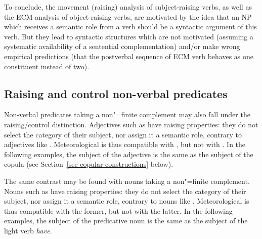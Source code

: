 To conclude, the movement (raising) analysis of subject-raising verbs, as well as the ECM analysis of object-raising verbs, are motivated by the idea that an NP which receives a semantic role from a verb should be a syntactic argument of this verb.
But they lead to syntactic structures which are not motivated (assuming a systematic availability of a sentential complementation) and/or make wrong empirical predictions (that the postverbal sequence of ECM verb behaves as one constituent instead of two).
 
\subsection{Raising and control non-verbal predicates}\label{nonverbal}

Non-verbal predicates taking a non"=finite complement may also fall under the raising/control distinction.  Adjectives such as  have raising properties: they do not select the category of their subject, nor assign it a semantic role, contrary to adjectives like . Meteorological  is thus compatible with , but not with . In the following examples, the subject of the adjective is the same as the subject of the copula (see Section~\ref{sec-copular-constructions} below).

\eal
{}
\zl

The same contrast may be found with  nouns taking a non"=finite complement. Nouns such as  have raising properties: they do not select the category of their subject, nor assign it a semantic role, contrary to nouns like . Meteorological  is thus compatible with the former, but not with the latter. In the following examples, the subject of the predicative noun is the same as the subject of the light verb \emph{have}.


